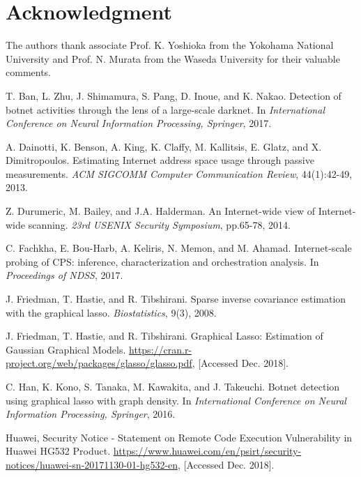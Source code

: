 \documentclass[conference]{IEEEtran}
\begin{document}
\section*{Acknowledgment}
The authors thank associate Prof. K. Yoshioka from the Yokohama National University and  Prof. N. Murata from the Waseda University for their valuable comments.


\begin{thebibliography}{99}

T. Ban, L. Zhu, J. Shimamura, S. Pang, D. Inoue, and K. Nakao. Detection of botnet activities through the lens of a large-scale darknet. In {\it International Conference on Neural Information Processing, Springer}, 2017.

A. Dainotti, K. Benson, A. King, K. Claffy, M. Kallitsis, E. Glatz, and X. Dimitropoulos. Estimating Internet address space usage through passive measurements. {\it ACM SIGCOMM Computer Communication Review}, 44(1):42-49, 2013.

Z. Durumeric, M. Bailey, and J.A. Halderman. An Internet-wide view of Internet-wide scanning. {\it 23rd USENIX Security Symposium}, pp.65-78, 2014.

C. Fachkha, E. Bou-Harb, A. Keliris, N. Memon, and M. Ahamad. Internet-scale probing of CPS: inference, characterization and orchestration analysis. In {\it Proceedings of NDSS}, 2017.

J. Friedman, T. Hastie, and R. Tibshirani. Sparse inverse covariance estimation with the graphical lasso. {\it Biostatistics}, 9(3), 2008.

J. Friedman, T. Hastie, and R. Tibshirani. Graphical Lasso: Estimation of Gaussian Graphical Models. \url{https://cran.r-project.org/web/packages/glasso/glasso.pdf}, [Accessed Dec. 2018].

C. Han, K. Kono, S. Tanaka, M. Kawakita, and J. Takeuchi. Botnet detection using graphical lasso with graph density. In {\it International Conference on Neural Information Processing, Springer}, 2016.

Huawei, Security Notice - Statement on Remote Code Execution Vulnerability in Huawei HG532 Product. \url{https://www.huawei.com/en/psirt/security-notices/huawei-sn-20171130-01-hg532-en}, [Accessed Dec. 2018].


\end{thebibliography}
\end{document}
